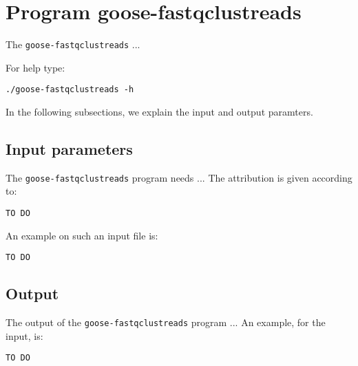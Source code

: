 \section{Program goose-fastqclustreads}
The \texttt{goose-fastqclustreads} ...

For help type:
\begin{lstlisting}
./goose-fastqclustreads -h
\end{lstlisting}
In the following subsections, we explain the input and output paramters.

\subsection{Input parameters}

The \texttt{goose-fastqclustreads} program needs ...
The attribution is given according to:
\begin{lstlisting}
TO DO
\end{lstlisting}

An example on such an input file is:
\begin{lstlisting}
TO DO
\end{lstlisting}

\subsection{Output}
The output of the \texttt{goose-fastqclustreads} program ...
An example, for the input, is:
\begin{lstlisting}
TO DO
\end{lstlisting}
